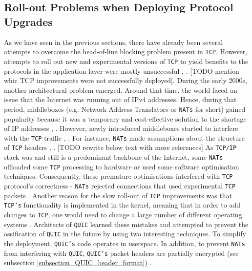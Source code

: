 \documentclass[12pt,a4paper,twoside,openright]{report}
\begin{document}
\subsection{Roll-out Problems when Deploying Protocol Upgrades}
As we have seen in the previous sections, there have already been several attempts to overcome the head-of-line blocking problem present in \texttt{TCP}.
However, attempts to roll out new and experimental versions of \texttt{TCP} to yield benefits to the protocols in the application layer were mostly unsuccessful \cite{bib_Netdev_0x13_QUIC_Tutorial}, \cite{PollardBarry2019HiAP}.
[TODO mention whic TCP improvements were not successfully deployed].
During the early 2000s, another architectural problem emerged.
Around that time, the world faced an issue that the Internet was running out of IPv4 addresses.
Hence, during that period, middleboxes (e.g. Network Address Translators or  \texttt{NATs} for short) gained popularity because it was a temporary and cost-effective solution to the shortage of IP addresses \cite{MurphyNiallRichard2005Ina}, \cite{bib_Netdev_0x13_QUIC_Tutorial}.
However, newly introduced middleboxes started to interfere with the \texttt{TCP} traffic \cite{bib_Netdev_0x13_QUIC_Tutorial}, \cite{PollardBarry2019HiAP}.
For instance,  \texttt{NATs} made assumptions about the structure of \texttt{TCP} headers \cite{bib_Netdev_0x13_QUIC_Tutorial}, \cite{PollardBarry2019HiAP}.
[TODO rewrite below text with more references]
As \texttt{TCP/IP} stack was and still is a predominant backbone of the Internet, some \texttt{NATs} offloaded some \texttt{TCP} processing to hardware or used some software optimisation techniques.
Consequently, these premature optimisations interfered with \texttt{TCP} protocol's correctness - \texttt{NATs} rejected connections that used experimental \texttt{TCP} packets \cite{PollardBarry2019HiAP}.
Another reason for the slow roll-out of \texttt{TCP} improvements was that \texttt{TCP's} functionality is implemented in the kernel, meaning that in order to add changes to \texttt{TCP}, one would need to change a large number of different operating systems  \cite{PollardBarry2019HiAP}.
Architects of \texttt{QUIC} learned these mistakes and attempted to prevent the ossification of \texttt{QUIC} in the future by using two interesting techniques.
To simplify the deployment, \texttt{QUIC's} code operates in userspace.
In addition, to prevent \texttt{NATs} from interfering with \texttt{QUIC}, \texttt{QUIC's} packet headers are partially encrypted (see subsection \ref{subsection_QUIC_header_format}) \cite{bib_Netdev_0x13_QUIC_Tutorial}.
\end{document}
